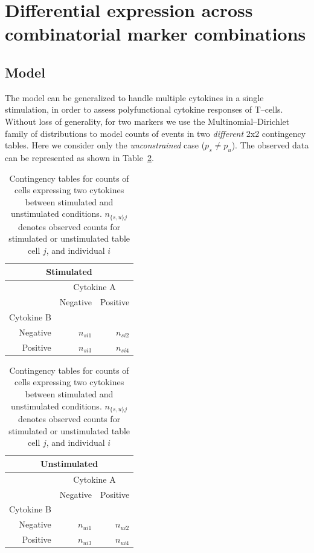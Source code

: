 \documentclass[11pt]{article}
\begin{document}
\section{Differential expression across combinatorial marker combinations}
\subsection{Model}
The model can be generalized to handle multiple cytokines in a single stimulation, in order to assess polyfunctional cytokine responses of T--cells. Without loss of generality, for two markers we use the Multinomial--Dirichlet family of distributions to model counts of events in two \textit{different} 2x2 contingency tables. Here we consider only the \emph{unconstrained} case ($p_s\ne p_u$). The observed data can be represented as shown in Table~\ref{tab:multdir}.
\begin{table}[h]
\centering
\parbox{0.8\linewidth}{
\caption{Contingency tables for counts of cells expressing two cytokines between stimulated and unstimulated conditions. $n_{\{s,u\}j}$ denotes observed counts for stimulated or unstimulated table cell $j$, and individual $i$  }\label{tab:multdir}
\begin{minipage}[b]{0.5\linewidth}
\centering
\begin{tabular}{rrr}
\multicolumn{3}{c}{Stimulated}\\
  \hline
\multicolumn{1}{l}{}&
\multicolumn{2}{c}{Cytokine A}\\
 & Negative & Positive \\ 
 \multicolumn{1}{l}{Cytokine B}&&\\
  \hline
Negative &   $n_{si1}$ &   $n_{si2}$ \\ 
Positive &   $n_{si3}$ &   $n_{si4}$ \\ 
   \hline
\end{tabular}
\end{minipage}
\begin{minipage}[b]{0.5\linewidth}
\centering
\begin{tabular}{rrr}
\multicolumn{3}{c}{Unstimulated}\\
  \hline
\multicolumn{1}{l}{}&
\multicolumn{2}{c}{Cytokine A}\\
 & Negative & Positive \\ 
 \multicolumn{1}{l}{Cytokine B}&&\\
  \hline
Negative &   $n_{ui1}$ &   $n_{ui2}$ \\ 
Positive &   $n_{ui3}$ &   $n_{ui4}$ \\ 
   \hline
\end{tabular}
\end{minipage}
}
\end{table}
\end{document}
